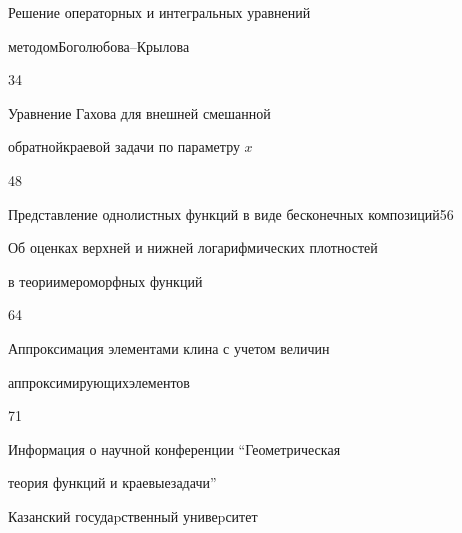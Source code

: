 

{Решение операторных и интегральных уравнений


методом\newline Боголюбова--Крылова}{34}




{Уравнение Гахова для внешней смешанной 


обратной\newline краевой задачи по параметру $x$}{48}




{Представление однолистных функций  в виде бесконечных композиций}{56}




{Об оценках верхней и нижней логарифмических плотностей


в теории\newline мероморфных функций}{64}




{Аппроксимация элементами клина с учетом  величин 


аппроксимирующих\newline элементов}{71}


\medskip





\noindent{}Информация о научной конференции ``Геометрическая


теория функций и краевые\newline задачи'' 











\vfill


\noindent\raisebox{2pt}{\copyright} Казанский госудаpственный унивеpситет





